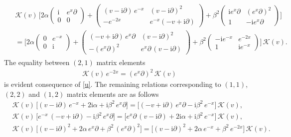 \documentclass[11pt]{article}
\numberwithin{equation}{section}
\theoremstyle{plain}
\theoremstyle{definition}
\renewcommand{\imath}{\mathrm{i}}
\begin{document}
\begin{align} \label{Kmatrrel0}
	\begin{aligned}
		& \mathcal{K}(v)\,\Biggl[
		2\alpha 
		\begin{pmatrix}
			\imath & e^{x}\partial \\[4pt]
			0 & 0 \end{pmatrix} 
		+
		\begin{pmatrix}
			(v-\imath\partial) \, e^{-x} & (v-\imath\partial)^2 \\[4pt]
			-e^{-2x} & e^{-x}(-v+\imath\partial) \end{pmatrix} 
		+ \beta^2 \begin{pmatrix}
			\imath e^{x}\partial & (e^x\partial)^2 \\[4pt]
			1 & - \imath e^{x}\partial \end{pmatrix} \Biggr] \\[6pt]
		& = \Biggl[
		2\alpha
		\begin{pmatrix}
			0 & e^{-x} \\[4pt]
			0 & \imath \end{pmatrix}
		+ \begin{pmatrix}
			(-v+\imath\partial) \, e^{x}\partial & (v-\imath\partial)^2 \\[4pt]
			-(e^{x}\partial)^2 & e^{x}\partial\,(v-\imath\partial) \end{pmatrix}
		+ \beta^2
		\begin{pmatrix}
			- \imath e^{-x} & e^{-2x} \\[4pt]
			1 & \imath e^{-x} \end{pmatrix} \Biggr]
		\,\mathcal{K}(v).
	\end{aligned}
\end{align}
The equality between $(2,1)$ matrix elements 
\begin{align*}
\mathcal{K}(v)\,e^{-2x} = (e^{x}\partial)^2 \, \mathcal{K}(v)
\end{align*}
is evident consequence of \eqref{u}. The remaining relations corresponding to 
$(1,1)$, $(2,2)$ and $(1,2)$ matrix elements are as follows
\begin{align} \nonumber
&\mathcal{K}(v)\, \bigl[(v-\imath\partial)\,e^{-x}+2\imath\alpha +
\imath\beta^2\,e^{x}\partial\bigr] =
\bigl[(-v+\imath\partial)\,e^{x}\partial-\imath\beta^2\,e^{-x}\bigr]\,\mathcal{K}(v), \\[6pt] \nonumber &\mathcal{K}(v)\,\bigl[e^{-x}\,(-v+\imath\partial)-\imath\beta^2\,e^{x}\partial\bigr] =
\bigl[e^{x}\partial\,(v-\imath\partial)+2\imath\alpha+\imath\beta^2\,e^{-x}\bigr]\,\mathcal{K}(v), \\[6pt] \label{Krel-33}
&\mathcal{K}(v)\,\bigl[(v-\imath\partial)^2+2\alpha\,e^{x}\partial+
\beta^2\,(e^{x}\partial)^2\bigr] =
\bigl[(v-\imath\partial)^2+2\alpha\,e^{-x}+\beta^2\,e^{-2x}\bigr]\,\mathcal{K}(v).
\end{align}
\end{document}
